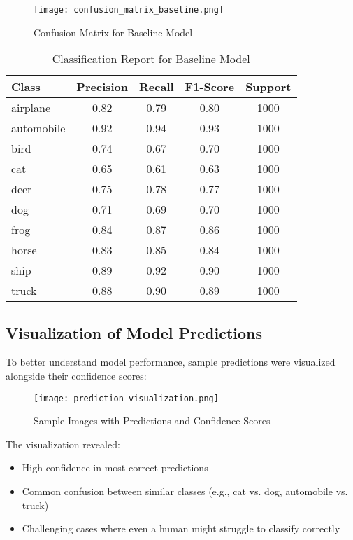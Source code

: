 \documentclass[12pt]{article}
\begin{document}
\begin{figure}[h]
    \centering
    \texttt{[image: confusion\_matrix\_baseline.png]}
    \caption{Confusion Matrix for Baseline Model}
\end{figure}

\begin{table}[h]
\centering
\begin{tabular}{|l|c|c|c|c|}
\hline
\textbf{Class} & \textbf{Precision} & \textbf{Recall} & \textbf{F1-Score} & \textbf{Support} \\
\hline
airplane & 0.82 & 0.79 & 0.80 & 1000 \\
automobile & 0.92 & 0.94 & 0.93 & 1000 \\
bird & 0.74 & 0.67 & 0.70 & 1000 \\
cat & 0.65 & 0.61 & 0.63 & 1000 \\
deer & 0.75 & 0.78 & 0.77 & 1000 \\
dog & 0.71 & 0.69 & 0.70 & 1000 \\
frog & 0.84 & 0.87 & 0.86 & 1000 \\
horse & 0.83 & 0.85 & 0.84 & 1000 \\
ship & 0.89 & 0.92 & 0.90 & 1000 \\
truck & 0.88 & 0.90 & 0.89 & 1000 \\
\hline
\end{tabular}
\caption{Classification Report for Baseline Model}
\end{table}

\subsection{Visualization of Model Predictions}
To better understand model performance, sample predictions were visualized alongside their confidence scores:

\begin{figure}[h]
    \centering
    \texttt{[image: prediction\_visualization.png]}
    \caption{Sample Images with Predictions and Confidence Scores}
\end{figure}

The visualization revealed:
\begin{itemize}
    \item High confidence in most correct predictions
    \item Common confusion between similar classes (e.g., cat vs. dog, automobile vs. truck)
    \item Challenging cases where even a human might struggle to classify correctly
\end{itemize}
\end{document}
